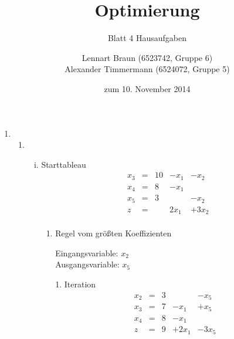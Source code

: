 \documentclass[a4paper]{scrartcl}
\title{Optimierung}
\subtitle{Blatt 4 Hausaufgaben}
\author{
	Lennart Braun (6523742, Gruppe 6) \\
    Alexander Timmermann (6524072, Gruppe 5)
}
\date{zum 10. November 2014}
\begin{document}
\maketitle

\begin{enumerate}[label=\bfseries\arabic*.]
    \item %
        \begin{enumerate}
            \item
                \begin{enumerate}[(i)]
                    \item
                        Starttableau
                        \begin{equation}
                            \begin{array}{rcrrr}
                                x_3 & = & 10 & -x_1 & -x_2 \\
                                x_4 & = & 8 & -x_1 &  \\
                                x_5 & = & 3 &  & -x_2 \\
                                \hline
                                z   & = &   & 2x_1 & +3x_2 \\
                            \end{array}
                        \end{equation}

                        \begin{enumerate}
                            \item Regel vom größten Koeffizienten

                                Eingangsvariable: $x_2$ \\
                                Ausgangsvariable: $x_5$

                                1. Iteration
                                \begin{equation}
                                    \begin{array}{rcrrr}
                                        x_2 & = & 3 &  & -x_5 \\
                                        x_3 & = & 7 & -x_1 & +x_5 \\
                                        x_4 & = & 8 & -x_1 &  \\
                                        \hline
                                        z   & = & 9 & +2x_1 & -3x_5 \\
                                    \end{array}
                                \end{equation}


\end{enumerate}
\end{enumerate}
\end{enumerate}
\end{enumerate}
\end{document}
